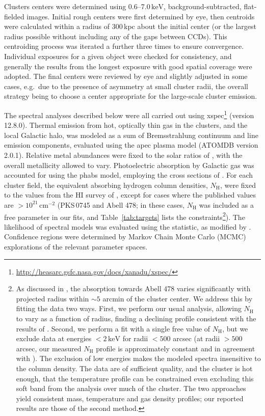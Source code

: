\documentclass[useAMS,usenatbib,usegraphicx]{mn2e}
\newcommand*{\mysub}[2]{\ensuremath{#1_{\mathrm{#2}}}}
\newcommand*{\unit}[1]{\ensuremath{\mathrm{\, #1}}}
\newcommand*{\NH}{\mysub{N}{H}}
\newcommand*{\cm}{\unit{cm}}
\newcommand*{\keV}{\unit{keV}}
\newcommand*{\tabref}{Table}
\begin{document}
Clusters centers were determined using 0.6--7.0\keV{}, background-subtracted, flat-fielded images. Initial rough centers were first determined by eye, then centroids were calculated within a radius of 300\,kpc about the initial center (or the largest radius possible without including any of the gaps between CCDs). This centroiding process was iterated a further three times to  ensure convergence. Individual exposures for a given object were checked for consistency, and generally the results from the longest exposure with good spatial coverage were adopted. The final centers were reviewed by eye and slightly adjusted in some cases, e.g.\ due to the presence of asymmetry at small cluster radii, the overall strategy being to choose a center appropriate for the large-scale cluster emission.

\newpage

The spectral analyses described below were all carried out using {\sc xspec}\footnote{\url{http://heasarc.gsfc.nasa.gov/docs/xanadu/xspec/}} (version 12.8.0). Thermal emission from hot, optically thin gas in the clusters, and the local Galactic halo, was modeled as a sum of Bremsstrahlung continuum and line emission components, evaluated using the {\sc apec} plasma model (ATOMDB version 2.0.1). Relative metal abundances were fixed to the solar ratios of \citet{Asplund0909.0948}, with the overall metallicity allowed to vary. Photoelectric absorption by Galactic gas was accounted for using the {\sc phabs} model, employing the cross sections of \citet{Balucinska1992ApJ...400..699B}. For each cluster field, the equivalent absorbing hydrogen column densities, \NH{}, were fixed to the values from the HI survey of \citet{Kalberla0504140}, except for cases where the published values are $>10^{21}\cm^{-2}$ (PKS\,0745 and Abell 478; in these cases, \NH{} was included as a free parameter in our fits, and \tabref~\ref{tab:targets} lists the constraints\footnote{As discussed in \citet{Allen1993MNRAS.262..901A}, the absorption towards Abell 478 varies significantly with projected radius within $\sim5$ arcmin of the cluster center. We address this by fitting the data two ways. First, we perform our usual analysis, allowing \NH{} to vary as a function of radius, finding a declining profile consistent with the results of \citet{Allen1993MNRAS.262..901A}. Second, we perform a fit with a single free value of \NH{}, but we exclude data at energies $<2\keV$ for radii $<500$ arcsec (at radii $>500$ arcsec, our measured \NH{} profile is approximately constant and in agreement with \citealt{Kalberla0504140}). The exclusion of low energies makes the modeled spectra insensitive to the column density. The data are of sufficient quality, and the cluster is hot enough, that the temperature profile can be constrained even excluding this soft band from the analysis over much of the cluster. The two approaches yield consistent mass, temperature and gas density profiles; our reported results are those of the second method.}). The likelihood of spectral models was evaluated using the \citet{Cash1979ApJ...228..939} statistic, as modified by \citet[][the $C$-statistic]{Arnaud1996ASPC..101...17A}. Confidence regions were determined by Markov Chain Monte Carlo (MCMC) explorations of the relevant parameter spaces.
\end{document}
